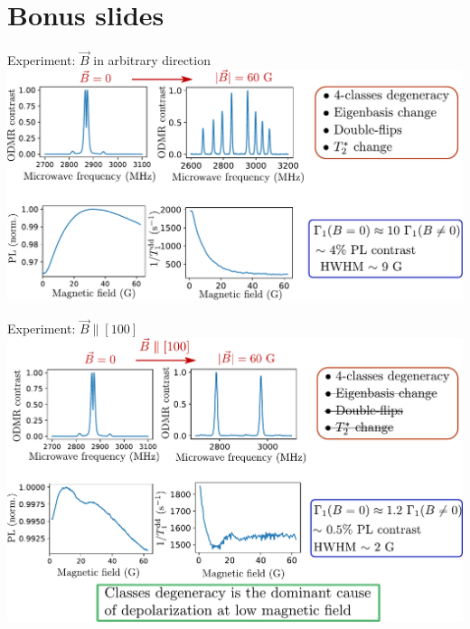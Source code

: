 \documentclass{beamer}
\begin{document}
\section*{Bonus slides}

\begin{frame}{Experiment: $\vec B$ in arbitrary direction}
\centering
\includegraphics[width=\textwidth,height=0.85\textheight,keepaspectratio]{Slide_T1_PL_1x1x1x1}
\end{frame}

\begin{frame}{Experiment: $\vec B \parallel [100]$}
\centering
\includegraphics[width=\textwidth,height=0.85\textheight,keepaspectratio]{Slide_T1_PL_100}
\end{frame}
\end{document}
